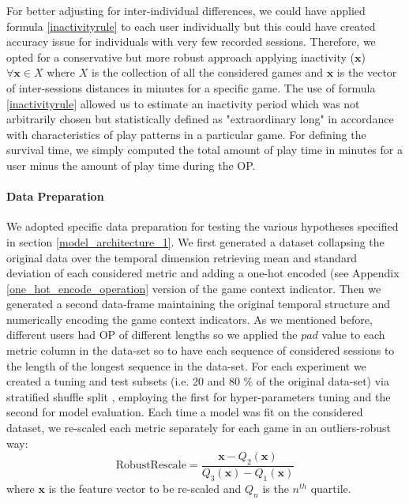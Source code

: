 For better adjusting for inter-individual differences, we could have applied formula \ref{inactivityrule} to each user individually but this could have created accuracy issue for individuals with very few recorded sessions. Therefore, we opted for a conservative but more robust approach applying inactivity ($\mathbf{x}$) $\forall \mathbf{x} \in X$ where $X$ is the collection of all the considered games and $\mathbf{x}$ is the vector of inter-sessions distances in minutes for a specific game. The use of formula \ref{inactivityrule} allowed us to estimate an inactivity period which was not arbitrarily chosen but statistically defined as "extraordinary long" in accordance with characteristics of play patterns in a particular game. For defining the survival time, we simply computed the total amount of play time in minutes for a user minus the amount of play time during the OP.



\paragraph*{Data Preparation}
\label{data_preparation_1}
We adopted specific data preparation for testing the various hypotheses specified in section \ref{model_architecture_1}. We first generated a dataset collapsing the original data over the temporal dimension retrieving mean and standard deviation of each considered metric and adding a one-hot encoded (see Appendix \ref{one_hot_encode_operation} version of the game context indicator. Then we generated a second data-frame maintaining the original temporal structure and numerically encoding the game context indicators. As we mentioned before, different users had OP of different lengths so we applied the $pad$ value to each metric column in the data-set so to have each sequence of considered sessions to the length of the longest sequence in the data-set. For each experiment we created a tuning and test subsets (i.e. 20 and 80 \% of the original data-set) via stratified shuffle split \cite{scikit-learn}, employing the first for hyper-parameters tuning and the second for model evaluation. Each time a model was fit on the considered dataset, we re-scaled each metric separately for each game in an outliers-robust way:
\begin{equation}
\label{robustscaler}
    \text{RobustRescale}=
        \dfrac
            {\mathbf{x} - Q_2(\mathbf{x})}
            {Q_3(\mathbf{x}) - Q_1(\mathbf{x})}
\end{equation}
where $\mathbf{x}$ is the feature vector to be re-scaled and $Q_n$ is the $n^{th}$ quartile. 

